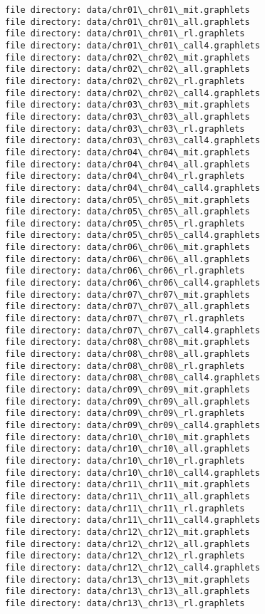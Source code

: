 \documentclass[11pt]{article}
\begin{document}
    \begin{Verbatim}[commandchars=\\\{\}]
file directory: data/chr01\_chr01\_mit.graphlets
file directory: data/chr01\_chr01\_all.graphlets
file directory: data/chr01\_chr01\_rl.graphlets
file directory: data/chr01\_chr01\_call4.graphlets
file directory: data/chr02\_chr02\_mit.graphlets
file directory: data/chr02\_chr02\_all.graphlets
file directory: data/chr02\_chr02\_rl.graphlets
file directory: data/chr02\_chr02\_call4.graphlets
file directory: data/chr03\_chr03\_mit.graphlets
file directory: data/chr03\_chr03\_all.graphlets
file directory: data/chr03\_chr03\_rl.graphlets
file directory: data/chr03\_chr03\_call4.graphlets
file directory: data/chr04\_chr04\_mit.graphlets
file directory: data/chr04\_chr04\_all.graphlets
file directory: data/chr04\_chr04\_rl.graphlets
file directory: data/chr04\_chr04\_call4.graphlets
file directory: data/chr05\_chr05\_mit.graphlets
file directory: data/chr05\_chr05\_all.graphlets
file directory: data/chr05\_chr05\_rl.graphlets
file directory: data/chr05\_chr05\_call4.graphlets
file directory: data/chr06\_chr06\_mit.graphlets
file directory: data/chr06\_chr06\_all.graphlets
file directory: data/chr06\_chr06\_rl.graphlets
file directory: data/chr06\_chr06\_call4.graphlets
file directory: data/chr07\_chr07\_mit.graphlets
file directory: data/chr07\_chr07\_all.graphlets
file directory: data/chr07\_chr07\_rl.graphlets
file directory: data/chr07\_chr07\_call4.graphlets
file directory: data/chr08\_chr08\_mit.graphlets
file directory: data/chr08\_chr08\_all.graphlets
file directory: data/chr08\_chr08\_rl.graphlets
file directory: data/chr08\_chr08\_call4.graphlets
file directory: data/chr09\_chr09\_mit.graphlets
file directory: data/chr09\_chr09\_all.graphlets
file directory: data/chr09\_chr09\_rl.graphlets
file directory: data/chr09\_chr09\_call4.graphlets
file directory: data/chr10\_chr10\_mit.graphlets
file directory: data/chr10\_chr10\_all.graphlets
file directory: data/chr10\_chr10\_rl.graphlets
file directory: data/chr10\_chr10\_call4.graphlets
file directory: data/chr11\_chr11\_mit.graphlets
file directory: data/chr11\_chr11\_all.graphlets
file directory: data/chr11\_chr11\_rl.graphlets
file directory: data/chr11\_chr11\_call4.graphlets
file directory: data/chr12\_chr12\_mit.graphlets
file directory: data/chr12\_chr12\_all.graphlets
file directory: data/chr12\_chr12\_rl.graphlets
file directory: data/chr12\_chr12\_call4.graphlets
file directory: data/chr13\_chr13\_mit.graphlets
file directory: data/chr13\_chr13\_all.graphlets
file directory: data/chr13\_chr13\_rl.graphlets

\end{Verbatim}
\end{document}
